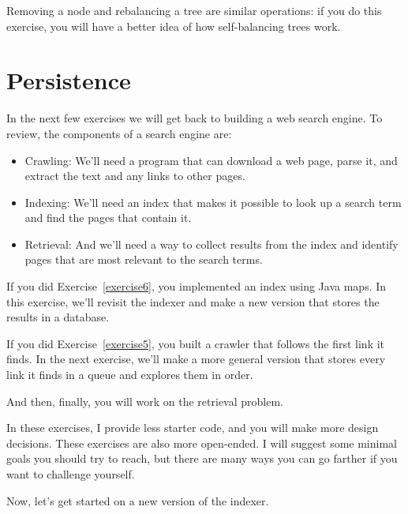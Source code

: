 \documentclass[12pt]{book}
\theoremstyle{exercise}
\begin{document}

Removing a node and rebalancing a tree are similar operations: if you do
this exercise, you will have a better idea of how self-balancing trees
work.



\chapter{Persistence}

In the next few exercises we will get back to building a web search
engine. To review, the components of a search engine are:

\begin{itemize}

\item
  Crawling: We'll need a program that can download a web page, parse it,
  and extract the text and any links to other pages.

\item
  Indexing: We'll need an index that makes it possible to look up a
  search term and find the pages that contain it.

\item
  Retrieval: And we'll need a way to collect results from the index and
  identify pages that are most relevant to the search terms.

\end{itemize}


If you did Exercise~\ref{exercise6}, you implemented an index
using Java maps. In this exercise, we'll revisit the indexer and make
a new version that stores the results in a database.


If you did Exercise~\ref{exercise5}, you
built a crawler that follows the first link it finds. In the next exercise,
we'll make a more general version that stores every link it finds in a
queue and explores them in order.

And then, finally, you will work on the retrieval problem.

In these exercises, I provide less starter code, and you will make more
design decisions. These exercises are also more open-ended. I will suggest
some minimal goals you should try to reach, but there are many ways you
can go farther if you want to challenge yourself.

Now, let's get started on a new version of the indexer.
\end{document}
